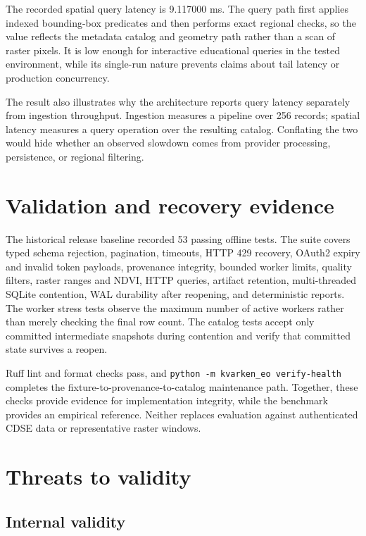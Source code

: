 The recorded spatial query latency is 9.117000 ms. The query path first applies indexed
bounding-box predicates and then performs exact regional checks, so the value reflects the
metadata catalog and geometry path rather than a scan of raster pixels. It is low enough for
interactive educational queries in the tested environment, while its single-run nature prevents
claims about tail latency or production concurrency.

The result also illustrates why the architecture reports query latency separately from ingestion
throughput. Ingestion measures a pipeline over 256 records; spatial latency measures a query
operation over the resulting catalog. Conflating the two would hide whether an observed slowdown
comes from provider processing, persistence, or regional filtering.

\section{Validation and recovery evidence}

The historical release baseline recorded 53 passing offline tests. The suite covers typed schema rejection, pagination,
timeouts, HTTP 429 recovery, OAuth2 expiry and invalid token payloads, provenance integrity,
bounded worker limits, quality filters, raster ranges and NDVI, HTTP queries, artifact retention,
multi-threaded SQLite contention, WAL durability after reopening, and deterministic reports.
The worker stress tests observe the maximum number of active workers rather than merely checking the
final row count. The catalog tests accept only committed intermediate snapshots during contention
and verify that committed state survives a reopen.

Ruff lint and format checks pass, and \texttt{python -m kvarken\_eo verify-health} completes the
fixture-to-provenance-to-catalog maintenance path. Together, these checks provide evidence for
implementation integrity, while the benchmark provides an empirical reference. Neither replaces
evaluation against authenticated CDSE data or representative raster windows.

\section{Threats to validity}

\subsection{Internal validity}

